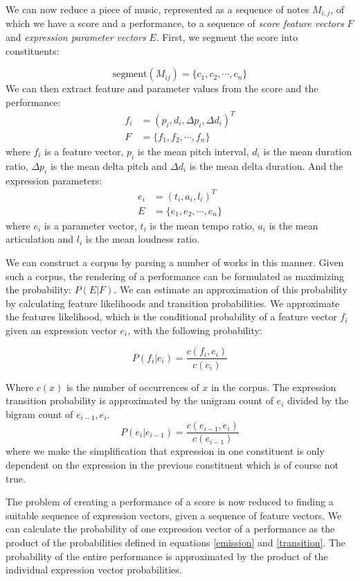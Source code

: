 \documentclass[a4paper,10pt]{article}
\begin{document}
We can now reduce a piece of music, represented as a sequence of notes $M_{i,j}$, of which we have a score and a performance, to a sequence of \textit{score feature vectors} $F$ and \textit{expression parameter vectors} $E$. First, we segment the score into constituents:

\[\mbox{segment}(M_{ij}) = \{c_1, c_2, \cdots, c_n\}\]
We can then extract feature and parameter values from the score and the performance:
\begin{align*}
f_i &= (p_i, d_i, \Delta p_i, \Delta d_i)^T\\
F &= \{f_1, f_2, \cdots, f_n\}
\end{align*}
where $f_i$ is a feature vector, $p_i$ is the mean pitch interval, $d_i$ is the mean duration ratio, $\Delta p_i$ is the mean delta pitch and $\Delta d_i$ is the mean delta duration.
And the expression parameters: 
\begin{align*}
e_i &= (t_i, a_i, l_i)^T\\
E &= \{e_1, e_2, \cdots, e_n\}
\end{align*}
where $e_i$ is a parameter vector, $t_i$ is the mean tempo ratio, $a_i$ is the mean articulation and $l_i$ is the mean loudness ratio.

We can construct a corpus by parsing a number of works in this manner. Given such a corpus, the rendering of a performance can be formulated as maximizing the probability: $P(E|F)$. We can estimate an approximation of this probability by calculating feature likelihoods and transition probabilities. We approximate the features likelihood, which is the conditional probability of a feature vector $f_i$ given an expression vector $e_i$, with the following probability:

\begin{equation}
\label{emission}
P(f_i|e_i) = \frac{c(f_i, e_i)}{c(e_i)}
\end{equation}

Where $c(x)$ is the number of occurrences of $x$ in the corpus.
The expression transition probability is approximated by the unigram count of $e_i$ divided by the bigram count of $e_{i-1}, e_i$.
\begin{equation}
\label{transition}
P(e_i|e_{i-1}) = \frac{c(e_{i-1}, e_i)}{c(e_{i-1})}
\end{equation}
where we make the simplification that expression in one constituent is only dependent on the expression in the previous constituent which is of course not true.

The problem of creating a performance of a score is now reduced to finding a suitable sequence of expression vectors, given a sequence of feature vectors. We can calculate the probability of one expression vector of a performance as the product of the probabilities defined in equations \ref{emission} and \ref{transition}. The probability of the entire performance is approximated by the product of the individual expression vector probabilities.
\end{document}

